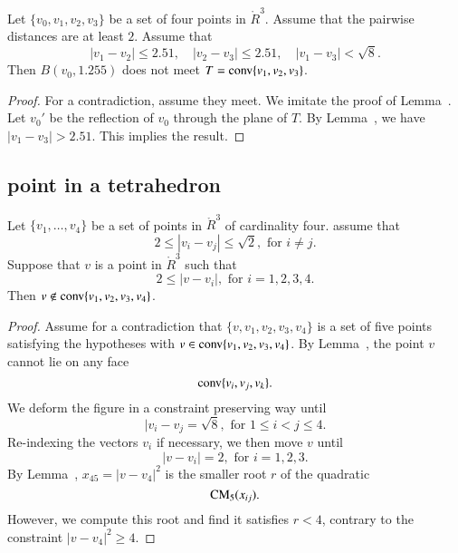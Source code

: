 \begin{lemma}
Let $\{v_0,v_1,v_2,v_3\}$ be a set of four points in $\ring{R}^3$.
Assume that the pairwise distances are at least $2$.  Assume
that 
$$
   |v_1-v_2|\le 2.51,\quad |v_2-v_3|\le 2.51,\quad |v_1-v_3|<\sqrt8.
$$
Then $B(v_0,1.255)$ does not meet $T={\operatorname{conv}}\{v_1,v_2,v_3\}$.
\end{lemma}


\begin{proof}   For a contradiction, assume they meet. 
We imitate the proof of Lemma~.
Let $v_0'$ be the reflection of $v_0$ through the plane of $T$.
By
Lemma~, we have $|v_1-v_3|>2.51$.
This implies the result.
\end{proof}








\newpage
\subsection{point in a tetrahedron}

\begin{lemma} 
Let $\{v_1,\ldots,v_4\}$ be a set of points in $\ring{R}^3$ of cardinality four.
assume that 
	$$2 \le |v_i-v_j| \le \sqrt2, \text{ for } i\ne j.$$
Suppose that $v$  is a point in $\ring{R}^3$ such that 
	$$2\le |v - v_i|,\text { for } i=1,2,3,4.$$
Then $v\not\in {\operatorname{conv}}\{v_1,v_2,v_3,v_4\}$.
\end{lemma}


\begin{proof}  Assume for a contradiction that $\{v,v_1,v_2,v_3,v_4\}$ is a set
of five points satisfying the hypotheses with $v\in{\operatorname{conv}}\{v_1,v_2,v_3,v_4\}$.
By Lemma~, the point $v$ cannot lie on any face
	$${\operatorname{conv}}\{v_i,v_j,v_k\}.$$
We deform the figure in a constraint preserving way until 
	$$
	|v_i-v_j = \sqrt8,\text{ for } 1 \le i < j \le 4.
	$$
Re-indexing the vectors $v_i$ if necessary, we then move $v$ until
	$$
	|v-v_i| = 2, \text{ for } i=1,2,3.
	$$
By Lemma~, $x_{45}=|v-v_4|^2$ is the smaller root $r$ of the quadratic
	$${\operatorname{CM}}_5(x_{ij}).$$
However, we compute this root and find it satisfies $r < 4$, contrary to the
constraint $|v-v_4|^2 \ge 4$.
\end{proof}


